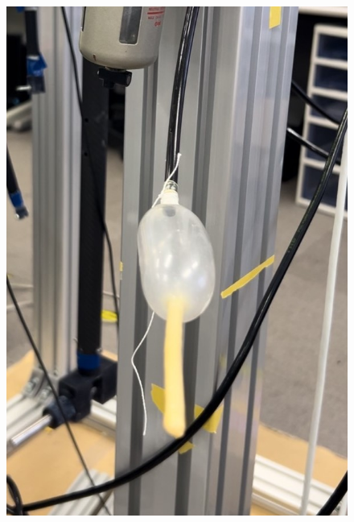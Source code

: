 \begin{figure}[h]
\begin{minipage}{0.33\hsize}
      \includegraphics[scale=0.3]{pic/zu6.jpg}
      \label{fig:60}
  \end{minipage} 
  \begin{minipage}{0.33\hsize}
      \centering

\end{minipage}
\end{figure}
